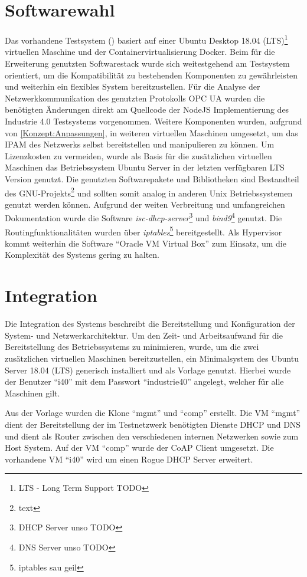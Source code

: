 \section{Softwarewahl}
Das vorhandene Testsystem (\cite{Weber2018}) basiert auf einer Ubuntu Desktop 18.04 (\ac{LTS})\footnote{LTS - Long Term Support TODO} virtuellen Maschine und der Containervirtualisierung Docker. Beim für die Erweiterung genutzten Softwarestack wurde sich weitestgehend am Testsystem orientiert, um die Kompatibilität zu bestehenden Komponenten zu gewährleisten und weiterhin ein flexibles System bereitzustellen. Für die Analyse der Netzwerkkommunikation des genutzten Protokolls \ac{OPC UA} wurden die benötigten Änderungen direkt am Quellcode der NodeJS Implementierung des Industrie 4.0 Testsystems vorgenommen. Weitere Komponenten wurden, aufgrund von \autoref{Konzept:Anpassungen}, in weiteren virtuellen Maschinen umgesetzt, um das \ac{IPAM} des Netzwerks selbst bereitstellen und manipulieren zu können. Um Lizenzkosten zu vermeiden, wurde als Basis für die zusätzlichen virtuellen Maschinen das Betriebssystem Ubuntu Server in der letzten verfügbaren \ac{LTS} Version genutzt. Die genutzten Softwarepakete und Bibliotheken sind Bestandteil des GNU-Projekts\footnote{text} und sollten somit analog in anderen Unix Betriebssystemen genutzt werden können. Aufgrund der weiten Verbreitung und umfangreichen Dokumentation wurde die Software \textit{isc-dhcp-server}\footnote{DHCP Server unso TODO} und \textit{bind9}\footnote{DNS Server unso TODO} genutzt. Die Routingfunktionalitäten wurden über \textit{iptables}\footnote{iptables sau geil} bereitgestellt. Als Hypervisor kommt weiterhin die Software "`Oracle VM Virtual Box"' zum Einsatz, um die Komplexität des Systems gering zu halten.

\section{Integration}
Die Integration des Systems beschreibt die Bereitstellung und Konfiguration der System- und Netzwerkarchitektur. Um den Zeit- und Arbeitsaufwand für die Bereitstellung des Betriebssystems zu minimieren, wurde, um die zwei zusätzlichen virtuellen Maschinen bereitzustellen, ein Minimalsystem des Ubuntu Server 18.04 (\ac{LTS}) generisch installiert und als Vorlage genutzt. Hierbei wurde der Benutzer "`i40"' mit dem Passwort "`industrie40"' angelegt, welcher für alle Maschinen gilt.

Aus der Vorlage wurden die Klone "`mgmt"' und "`comp"' erstellt. Die \ac{VM} "`mgmt"' dient der Bereitstellung der im Testnetzwerk benötigten Dienste \ac{DHCP} und \ac{DNS} und dient als Router zwischen den verschiedenen internen Netzwerken sowie zum Host System. Auf der \ac{VM} "`comp"' wurde der \ac{CoAP} Client umgesetzt. Die vorhandene \ac{VM} "`i40"' wird um einen Rogue DHCP Server erweitert. 

